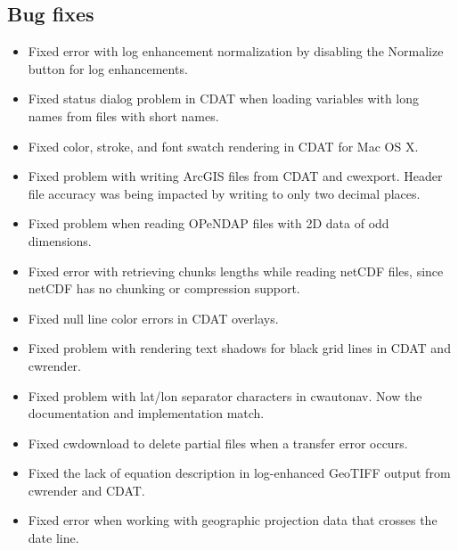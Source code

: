 \subsection*{Bug fixes}
\begin{itemize}

  \item Fixed error with log enhancement normalization by
  disabling the Normalize button for log enhancements.

  \item Fixed status dialog problem in CDAT when loading
  variables with long names from files with short names.

  \item Fixed color, stroke, and font swatch rendering in CDAT
  for Mac OS X.

  \item Fixed problem with writing ArcGIS files from CDAT and
  cwexport.  Header file accuracy was being impacted by writing
  to only two decimal places.

  \item Fixed problem when reading OPeNDAP files with 2D data of
  odd dimensions.

  \item Fixed error with retrieving chunks lengths while reading
  netCDF files, since netCDF has no chunking or compression
  support.

  \item Fixed null line color errors in CDAT overlays.

  \item Fixed problem with rendering text shadows for black grid
  lines in CDAT and cwrender.

  \item Fixed problem with lat/lon separator characters in
  cwautonav.  Now the documentation and implementation match.

  \item Fixed cwdownload to delete partial files when a transfer
  error occurs.

  \item Fixed the lack of equation description in log-enhanced
  GeoTIFF output from cwrender and CDAT.

  \item Fixed error when working with geographic projection data
  that crosses the date line.

\end{itemize}


